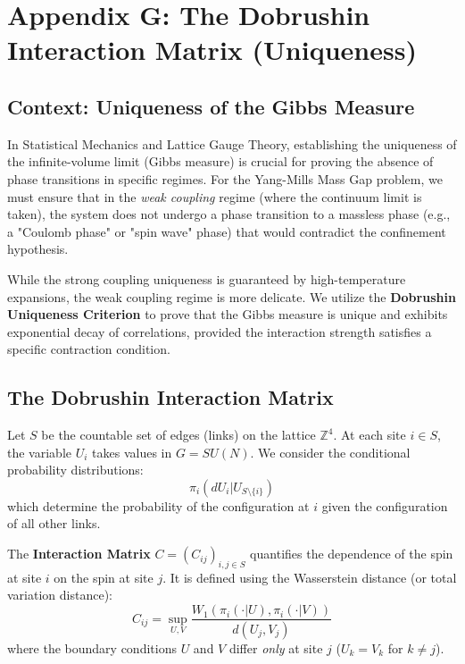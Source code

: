 \chapter{Appendix G: The Dobrushin Interaction Matrix (Uniqueness)}
\label{ch:appendix_dobrushin_uniqueness}
\label{app:convexity_dobrushin}

\section{Context: Uniqueness of the Gibbs Measure}
In Statistical Mechanics and Lattice Gauge Theory, establishing the uniqueness of the infinite-volume limit (Gibbs measure) is crucial for proving the absence of phase transitions in specific regimes. For the Yang-Mills Mass Gap problem, we must ensure that in the \textit{weak coupling} regime (where the continuum limit is taken), the system does not undergo a phase transition to a massless phase (e.g., a "Coulomb phase" or "spin wave" phase) that would contradict the confinement hypothesis.

While the strong coupling uniqueness is guaranteed by high-temperature expansions, the weak coupling regime is more delicate. We utilize the \textbf{Dobrushin Uniqueness Criterion} to prove that the Gibbs measure is unique and exhibits exponential decay of correlations, provided the interaction strength satisfies a specific contraction condition.

\section{The Dobrushin Interaction Matrix}
Let $S$ be the countable set of edges (links) on the lattice $\mathbb{Z}^4$. At each site $i \in S$, the variable $U_i$ takes values in $G = SU(N)$.
We consider the conditional probability distributions:
\begin{equation}
\pi_i(dU_i | U_{S \setminus \{i\}})
\end{equation}
which determine the probability of the configuration at $i$ given the configuration of all other links.

The \textbf{Interaction Matrix} $C = (C_{ij})_{i,j \in S}$ quantifies the dependence of the spin at site $i$ on the spin at site $j$. It is defined using the Wasserstein distance (or total variation distance):
\begin{equation}
C_{ij} = \sup_{U, V} \frac{W_1(\pi_i(\cdot | U), \pi_i(\cdot | V))}{d(U_j, V_j)}
\end{equation}
where the boundary conditions $U$ and $V$ differ \textit{only} at site $j$ ($U_k = V_k$ for $k \neq j$).

